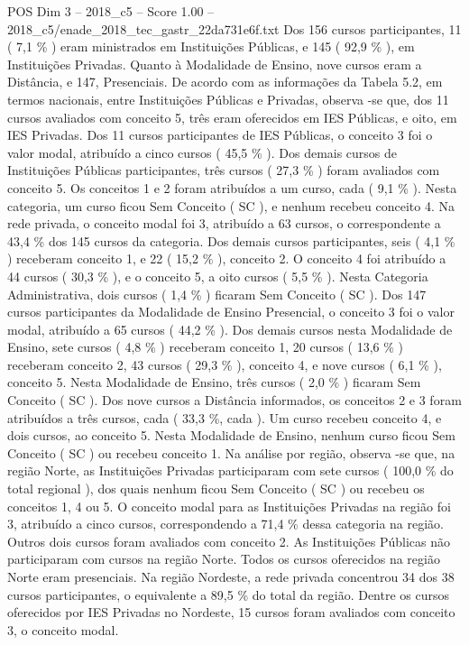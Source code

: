 \begin{textsample}{POS Dim 3 – 2018\_c5 – Score 1.00 – 2018\_c5/enade\_2018\_tec\_gastr\_22da731e6f.txt}
Dos 156 cursos participantes, 11 ( 7,1 \% ) eram ministrados em Instituições Públicas, e 145 ( 92,9 \% ), em Instituições Privadas.
Quanto à Modalidade de Ensino, nove cursos eram a Distância, e 147, Presenciais.
De acordo com as informações da Tabela 5.2, em termos nacionais, entre Instituições Públicas e Privadas, observa -se que, dos 11 cursos avaliados com conceito 5, três eram oferecidos em IES Públicas, e oito, em IES Privadas.
Dos 11 cursos participantes de IES Públicas, o conceito 3 foi o valor modal, atribuído a cinco cursos ( 45,5 \% ).
Dos demais cursos de Instituições Públicas participantes, três cursos ( 27,3 \% ) foram avaliados com conceito 5.
Os conceitos 1 e 2 foram atribuídos a um curso, cada ( 9,1 \% ).
Nesta categoria, um curso ficou Sem Conceito ( SC ), e nenhum recebeu conceito 4.
Na rede privada, o conceito modal foi 3, atribuído a 63 cursos, o correspondente a 43,4 \% dos 145 cursos da categoria.
Dos demais cursos participantes, seis ( 4,1 \% ) receberam conceito 1, e 22 ( 15,2 \% ), conceito 2.
O conceito 4 foi atribuído a 44 cursos ( 30,3 \% ), e o conceito 5, a oito cursos ( 5,5 \% ).
Nesta Categoria Administrativa, dois cursos ( 1,4 \% ) ficaram Sem Conceito ( SC ).
Dos 147 cursos participantes da Modalidade de Ensino Presencial, o conceito 3 foi o valor modal, atribuído a 65 cursos ( 44,2 \% ).
Dos demais cursos nesta Modalidade de Ensino, sete cursos ( 4,8 \% ) receberam conceito 1, 20 cursos ( 13,6 \% ) receberam conceito 2, 43 cursos ( 29,3 \% ), conceito 4, e nove cursos ( 6,1 \% ), conceito 5.
Nesta Modalidade de Ensino, três cursos ( 2,0 \% ) ficaram Sem Conceito ( SC ).
Dos nove cursos a Distância informados, os conceitos 2 e 3 foram atribuídos a três cursos, cada ( 33,3 \%, cada ).
Um curso recebeu conceito 4, e dois cursos, ao conceito 5.
Nesta Modalidade de Ensino, nenhum curso ficou Sem Conceito ( SC ) ou recebeu conceito 1.
Na análise por região, observa -se que, na região Norte, as Instituições Privadas participaram com sete cursos ( 100,0 \% do total regional ), dos quais nenhum ficou Sem Conceito ( SC ) ou recebeu os conceitos 1, 4 ou 5.
O conceito modal para as Instituições Privadas na região foi 3, atribuído a cinco cursos, correspondendo a 71,4 \% dessa categoria na região.
Outros dois cursos foram avaliados com conceito 2.
As Instituições Públicas não participaram com cursos na região Norte.
Todos os cursos oferecidos na região Norte eram presenciais.
Na região Nordeste, a rede privada concentrou 34 dos 38 cursos participantes, o equivalente a 89,5 \% do total da região.
Dentre os cursos oferecidos por IES Privadas no Nordeste, 15 cursos foram avaliados com conceito 3, o conceito modal.

\end{textsample}

